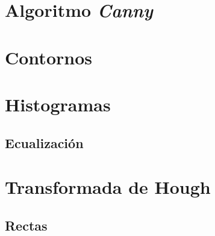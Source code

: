 \section{Algoritmo \emph{Canny}}

\section{Contornos}

\section{Histogramas}
\subsection{Ecualización}

\section{Transformada de Hough}
\subsection{Rectas}